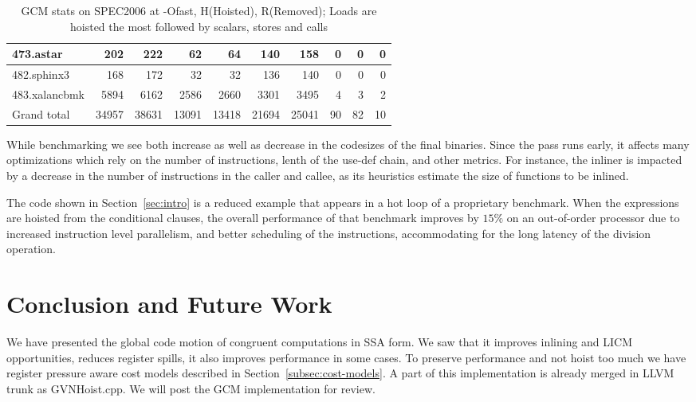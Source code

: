 \documentclass[acmlarge,review,anonymous]{acmart}\settopmatter{printfolios=true}
\begin{document}
\begin{table}[h!]
\begin{center}
\begin{tabular}{|l|r|r|r|r|r|r|r|r|r|}
 473.astar	  &  202	& 222	  &  62	  & 64	   & 140	& 158		& 0	& 0	& 0		\\\hline
 482.sphinx3	  &  168	& 172	  &  32	  & 32	   & 136	& 140		& 0	& 0	& 0		\\\hline
 483.xalancbmk	  &  5894	& 6162	  &  2586 & 2660   & 3301	& 3495		& 4	& 3	& 2	        \\\hline
 Grand total      &34957	&38631	  &13091  &13418   &21694	&25041	        &90	&82     &10             \\\hline
    \end{tabular}
  \end{center}
  \caption{GCM stats on SPEC2006 at -Ofast, H(Hoisted), R(Removed); Loads are hoisted the most followed by scalars, stores and calls}
  \label{tab:code-motion-metric}
\end{table}


While benchmarking \SPEC{} we see both increase as well as decrease in
the codesizes of the final binaries. Since the pass runs early, it affects many
optimizations which rely on the number of instructions, lenth of the use-def
chain, and other metrics. For instance, the inliner is impacted by a decrease in
the number of instructions in the caller and callee, as its heuristics estimate
the size of functions to be inlined.

The code shown in Section~\ref{sec:intro} is a reduced example that appears in a
hot loop of a proprietary benchmark.  When the expressions are hoisted from the
conditional clauses, the overall performance of that benchmark improves by
$15\%$ on an out-of-order processor due to increased instruction level
parallelism, and better scheduling of the instructions, accommodating for the
long latency of the division operation.

\section{Conclusion and Future Work}
\label{sec:future-work}
We have presented the global code motion of congruent computations in SSA
form. We saw that it improves inlining and LICM opportunities, reduces register
spills, it also improves performance in some cases. To preserve performance and
not hoist too much we have register pressure aware cost models described in
Section~\ref{subsec:cost-models}. A part of this implementation is already merged
in LLVM trunk as GVNHoist.cpp. We will post the GCM implementation for review.
\end{document}
